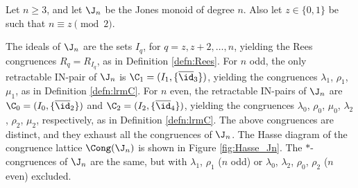 \begin{thm}\label{thm:cong-Jn}
Let $n\geq3$, and let $\J_n$ be the Jones monoid of degree $n$.  Also let $z\in\{0,1\}$ be such that $n\equiv z\pmod{2}$.
\begin{itemize}
 The ideals of $\J_n$ are the sets $I_q$, for $q=z,z+2,\ldots,n$, yielding the Rees congruences $R_q=R_{I_q}$, as in Definition \ref{defn:Rees}.
 For $n$ odd, the only retractable IN-pair of $\J_n$ is $\C_1=(I_1,\{\overline\id_3\})$, yielding the congruences $\lambda_1$, $\rho_1$, $\mu_1$, as in Definition \ref{defn:lrmC}.
 For $n$ even, the retractable IN-pairs of $\J_n$ are $\C_0=(I_0,\{\overline{\id}_2\})$ and $\C_2=(I_2,\{\overline{\id}_4\})$, yielding the congruences $\lambda_0$, $\rho_0$, $\mu_0$, $\lambda_2$, $\rho_2$, $\mu_2$, respectively, as in Definition \ref{defn:lrmC}.
 The above congruences are distinct, and they exhaust all the congruences of $\J_n$.
 The Hasse diagram of the congruence lattice $\Cong(\J_n) $ is shown in Figure \ref{fig:Hasse_Jn}.
 The $\ast$-congruences of $\J_n$ are the same, but with $\lambda_1$, $\rho_1$ ($n$ odd) or $\lambda_0$, $\lambda_2$, $\rho_0$, $\rho_2$ ($n$ even) excluded.
\end{itemize}
\end{thm}









